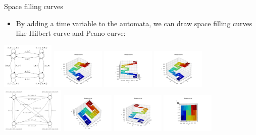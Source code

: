 \documentclass[leqno,presentation,usenames,dvipsnames]{beamer}
\begin{document}
\begin{frame}{Space filling curves}
    \begin{itemize}
        \item By adding a time variable to the automata, we can draw space filling curves like Hilbert curve and Peano curve:
    \end{itemize}
    
    \begin{center}
    \includegraphics[width=2.5cm]{FA20/images/fractals/hilbert-automata.png}
    \includegraphics[width=2.5cm]{FA20/images/fractals/hilbert-1.pdf}
    \includegraphics[width=2.5cm]{FA20/images/fractals/hilbert-2.pdf}
    \includegraphics[width=2.5cm]{FA20/images/fractals/hilbert-1.pdf} \\
    \includegraphics[width=3cm]{FA20/images/fractals/peano-automata.png}
    \includegraphics[width=2.5cm]{FA20/images/fractals/peano-1.pdf}
    \includegraphics[width=2.5cm]{FA20/images/fractals/peano-2.pdf}
    \includegraphics[width=2.5cm]{FA20/images/fractals/peano-3.pdf} \\
\end{center}
\end{frame}
\end{document}
